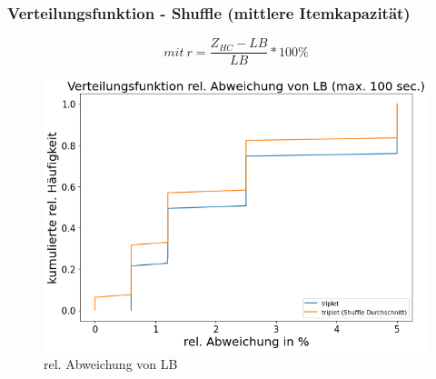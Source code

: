 \documentclass{beamer}
\begin{document}
%
%
%
\begin{frame}

\frametitle{Verteilungsfunktion - Shuffle (mittlere Itemkapazität)}

\begin{footnotesize}
\begin{equation}
mit \ r = \frac{Z_{HC}-LB}{LB} * 100\%
\end{equation}
\end{footnotesize}

\begin{figure}[!htbp]
\begin{center}
\includegraphics[scale=0.3]{img/dist8.png}
\end{center}
\caption{rel. Abweichung von LB}
\label{fig:architecture}
\end{figure}



\end{frame}
\end{document}
